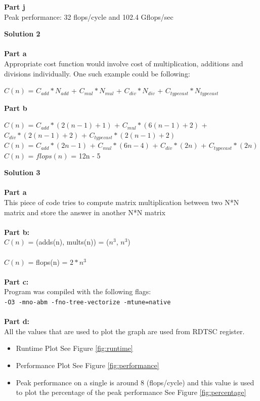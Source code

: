 \documentclass[letterpaper, 11pt]{article}
\begin{document}
\textbf{Part j} \\
Peak performance: 32 flops/cycle and 102.4 Gflops/sec
\bigskip

\textbf{Solution 2}\\ \\
\textbf{Part a} \\
Appropriate cost function would involve cost of multiplication, additions and divisions individually. One such example could be following:
\begin{center}
$C(n)$ = $C_{add} * N_{add}$ + $C_{mul} * N_{mul}$ + $C_{div} * N_{div}$ + $C_{typecast} * N_{typecast}$
\end{center}
\textbf{Part b}
\begin{center}
$C(n)$ = $C_{add}*(2(n-1)+1)$ + $C_{mul}*(6(n-1)+2)$ + $C_{div}*(2(n-1)+2)$ +  $C_{typecast}*(2(n-1)+2)$ \\
$C(n)$ = $C_{add}*(2n-1)$ + $C_{mul}*(6n-4)$ + $C_{div}*(2n)$ +  $C_{typecast}*(2n)$ \\
$C(n)$ = $flops(n)$ = 12n - 5
\end{center}

\textbf{Solution 3}\\ \\
\textbf{Part a} \\
This piece of code tries to compute matrix multiplication between two N*N matrix and store the answer in another N*N matrix \\ \\
\textbf{Part b:} \\
$C(n)$ = (adds(n), mults(n)) = ($n^3$, $n^3$) \\ \\
$C(n)$ = flops(n) = $2*n^3$ \\ \\
\textbf{Part c:}\\
Program was compiled with the following flags: \\
\texttt{-O3 -mno-abm -fno-tree-vectorize -mtune=native} \\ \\
\textbf{Part d:} \\ 
All the values that are used to plot the graph are used from RDTSC register. 
\begin{itemize}
\item Runtime Plot See Figure \ref{fig:runtime}
\item Performance Plot See Figure \ref{fig:performance} 
\item Peak performance on a single is around 8 (flops/cycle) and this value is used to plot the percentage of the peak performance See Figure \ref{fig:percentage}
\end{itemize}
\end{document}
